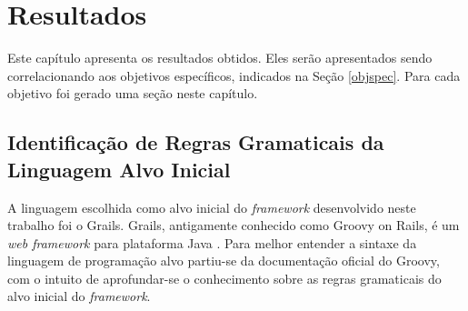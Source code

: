 \chapter[Resultados]{Resultados}
Este capítulo apresenta os resultados obtidos. Eles serão apresentados sendo
correlacionando aos objetivos específicos, indicados na Seção \ref{objspec}.
Para cada objetivo foi gerado uma seção neste capítulo.

\section{Identificação de Regras Gramaticais da Linguagem Alvo Inicial}
A linguagem escolhida como alvo inicial do \textit{framework} desenvolvido
neste trabalho foi o \textsf{Grails}. \textsf{Grails}, antigamente conhecido
como \textsf{Groovy on Rails}, é um \textit{web framework} para plataforma Java
\cite{grails2015}. Para melhor entender a sintaxe da linguagem de programação
alvo partiu-se da documentação oficial do \textsf{Groovy}, com o intuito de
aprofundar-se o conhecimento sobre as regras gramaticais do alvo inicial do
\textit{framework}.












